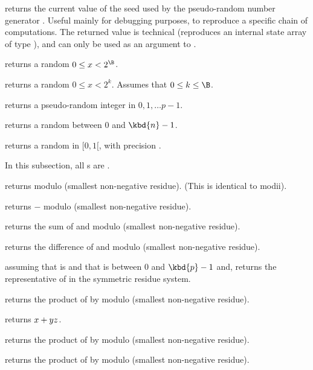  returns the current value of the seed used by the
pseudo-random number generator . Useful mainly for debugging
purposes, to reproduce a specific chain of computations. The returned value
is technical (reproduces an internal state array of type ),
and can only be used as an argument to .

 returns a random $0 \leq x < 2^\B$.

 returns a random $0 \leq x < 2^k$. Assumes
that $0 \leq k \leq \B$.

 returns a pseudo-random integer
in $0, 1, \dots p-1$.

 returns a random  between $0$ and $\kbd{n}
- 1$.

 returns a random  in $[0,1[$, with
precision .

 In this subsection, all s are
.

 returns  modulo  (smallest
non-negative residue). (This is identical to modii).

 returns $-$ modulo  (smallest
non-negative residue).

 returns the sum of  and
 modulo  (smallest non-negative residue).

 returns the difference of  and
 modulo  (smallest non-negative residue).

 assuming that  is
 and that  is between $0$ and $\kbd{p} - 1$ and,
returns the representative of  in the symmetric residue system.

 returns the product of  by
 modulo  (smallest non-negative residue).

 returns $x + y\*z$.

 returns the product of  by
 modulo  (smallest non-negative residue).

 returns the product of  by
 modulo  (smallest non-negative residue).

